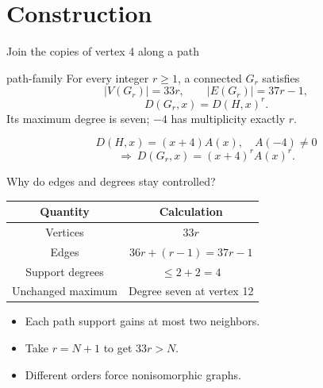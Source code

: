 \documentclass{beamer}
\begin{document}
\section{Construction}
\begin{frame}{Join the copies of vertex 4 along a path}
\begin{bookresult}{path-family}
For every integer $r\geq1$, a connected $G_r$ satisfies
\[|V(G_r)|=33r,\qquad |E(G_r)|=37r-1,\]
\[D(G_r,x)=D(H,x)^r.\]
Its maximum degree is seven; $-4$ has multiplicity exactly $r$.
\end{bookresult}
\[D(H,x)=(x+4)A(x),\quad A(-4)\ne0\]
\[\Longrightarrow\ D(G_r,x)=(x+4)^rA(x)^r.\]
\end{frame}
\begin{frame}{Why do edges and degrees stay controlled?}
\begin{center}\begin{tabular}{c|c}
Quantity & Calculation\\\hline
Vertices & $33r$\\
Edges & $36r+(r-1)=37r-1$\\
Support degrees & $\leq2+2=4$\\
Unchanged maximum & Degree seven at vertex 12
\end{tabular}\end{center}
\begin{itemize}
\item Each path support gains at most two neighbors.
\item Take $r=N+1$ to get $33r>N$.
\item Different orders force nonisomorphic graphs.
\end{itemize}
\end{frame}
\end{document}
